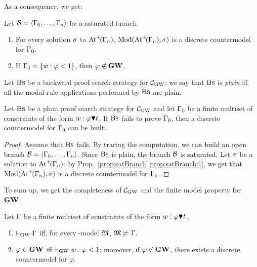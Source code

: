 \noindent
As a consequence, we get:
\begin{proposition}\label{prop:satBranch}
  Let $\mathcal{B}=\langle \Gamma_0,\dots,\Gamma_n \rangle$ be a saturated branch.
  \begin{enumerate}[label=(\roman*), ref=(\roman*),leftmargin=*]
  \item\label{prop:satBranch:1} For every solution  $\sigma$  to
    $\mathrm{At}^{+}\!(\Gamma_n)$, $\mathrm{Mod}(\mathrm{At}^{+}\!(\Gamma_n),\sigma)$ is a discrete
    countermodel for $\Gamma_0$.
      
  \item\label{prop:satBranch:2} If $\Gamma_0=\{ w : \varphi < 1\}$, then
    $\varphi\not\in\mathbf{GW}$.
  \end{enumerate}
\end{proposition}

\noindent
Let $\mbox{\textsc{Bs}}$ be a backward proof search strategy for $\mathcal{C}_{\mathrm{GW}}$; we say
that $\mbox{\textsc{Bs}}$ is \emph{plain} iff all the modal rule applications
performed by $\mbox{\textsc{Bs}}$ are plain.


\begin{lemma}\label{lemma:search}
  Let $\mbox{\textsc{Bs}}$ be a plain proof search strategy for $\mathcal{C}_{\mathrm{GW}}$ and let
  $\Gamma_0$ be a finite multiset of constraints of the form
  $w:\varphi\blacktriangledown t$.  If $\mbox{\textsc{Bs}}$ fails to prove $\Gamma_0$, then a
  discrete countermodel for $\Gamma_0$ can be built.
\end{lemma}

\begin{proof}
  Assume that $\mbox{\textsc{Bs}}$ fails.  By tracing the computation, we can build
  an open branch $\mathcal{B}=\langle \Gamma_0,\dots,\Gamma_n \rangle$.  Since $\mbox{\textsc{Bs}}$ is
  plain, the branch $\mathcal{B}$ is saturated.  Let $\sigma$ be a solution to
  $\mathrm{At}^{+}\!(\Gamma_n)$; by Prop.~\ref{prop:satBranch}\ref{prop:satBranch:1},
  we get that $\mathrm{Mod}(\mathrm{At}^{+}\!(\Gamma_n),\sigma)$ is a discrete countermodel for
  $\Gamma_0$.
\end{proof}

\noindent
To sum up, we get the completeness of $\mathcal{C}_{\mathrm{GW}}$ and the finite model
property for $\mathbf{GW}$.



\begin{proposition}[Completeness]\label{prop:compl}
  Let $\Gamma$ be a finite multiset of constraints of the form
  $w:\varphi\blacktriangledown t$.
  \begin{enumerate}[label=(\roman*), ref=(\roman*),leftmargin=*]    
  \item\label{prop:compl:1}
    $\vdash_{\mathrm{GW}} \Gamma$ iff, for every \GWM-model  $\mathfrak{M}$,  $\mathfrak{M}\not\models\Gamma$.

    
  \item\label{prop:compl2}
    $\varphi\in\mathbf{GW}$ iff  $\vdash_{\mathrm{GW}} w:\varphi < 1$; moreover, if
    $\varphi\not\in\mathbf{GW}$, 
    there exists a discrete countermodel for $\varphi$.
\end{enumerate}
\end{proposition}


